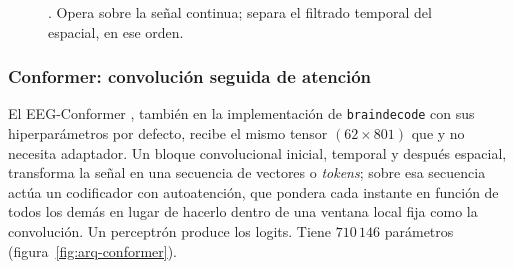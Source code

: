 \begin{figure}[H]
\centering
{}
\caption{\eegnet{}. Opera sobre la señal continua; separa el filtrado temporal del
espacial, en ese orden.}
\label{fig:arq-eegnet}
\end{figure}

\subsubsection{Conformer: convolución seguida de atención}

El EEG-Conformer \cite{song2023conformer}, también en la implementación de
\texttt{braindecode} con sus hiperparámetros por defecto, recibe el mismo tensor
$(62 \times 801)$ que \eegnet{} y no necesita adaptador. Un bloque
convolucional inicial, temporal y después espacial, transforma la señal en una secuencia de
vectores o \emph{tokens}; sobre esa secuencia actúa un codificador con autoatención, que
pondera cada instante en función de todos los demás en lugar de hacerlo dentro de una
ventana local fija como la convolución. Un perceptrón produce los logits. Tiene $710\,146$
parámetros (figura~\ref{fig:arq-conformer}).

